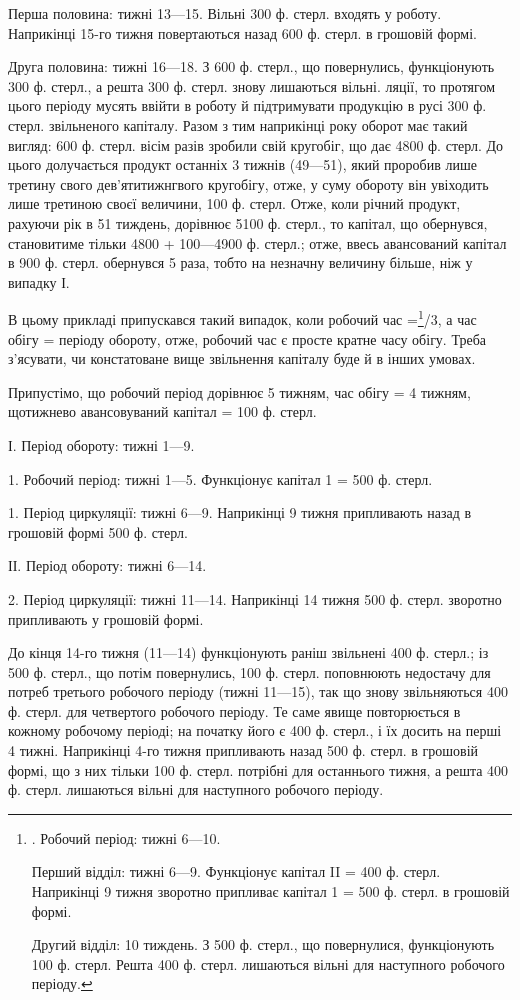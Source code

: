 Перша половина: тижні 13—15. Вільні 300 ф. стерл. входять у
роботу. Наприкінці 15-го тижня повертаються назад 600 ф. стерл. в грошовій
формі.

Друга половина: тижні 16—18. З 600 ф. стерл., що повернулись,
функціонують 300 ф. стерл., а решта 300 ф. стерл. знову лишаються
вільні.
ляції, то протягом цього періоду мусять ввійти в роботу й підтримувати
продукцію в русі 300 ф. стерл. звільненого капіталу. Разом з тим наприкінці
року оборот має такий вигляд: 600 ф. стерл. вісім разів зробили
свій кругобіг, що дає 4800 ф. стерл. До цього долучається продукт
останніх 3 тижнів (49—51), який проробив лише третину свого дев’ятитижнгвого
кругобігу, отже, у суму обороту він увіходить лише третиною
своєї величини, 100 ф. стерл. Отже, коли річний продукт, рахуючи рік в
51 тиждень, дорівнює 5100 ф. стерл., то капітал, що обернувся, становитиме
тільки 4800 + 100—4900 ф. стерл.; отже, ввесь авансований капітал
в 900 ф. стерл. обернувся 5 раза, тобто на незначну величину більше,
ніж у випадку І.

В цьому прикладі припускався такий випадок, коли робочий час =\footnote{
. Робочий період: тижні 6—10.

Перший відділ: тижні 6—9. Функціонує капітал II = 400 ф. стерл.
Наприкінці 9 тижня зворотно припливає капітал 1 = 500 ф. стерл. в грошовій
формі.

Другий відділ: 10 тиждень. З 500 ф. стерл., що повернулися, функціонують
100 ф. стерл. Решта 400 ф. стерл. лишаються вільні для наступного
робочого періоду.
}/3,
а час обігу =  періоду обороту, отже, робочий час є просте кратне
часу обігу. Треба з’ясувати, чи констатоване вище звільнення капіталу
буде й в інших умовах.

Припустімо, що робочий період дорівнює 5 тижням, час обігу = 4 тижням,
щотижнево авансовуваний капітал = 100 ф. стерл.

І. Період обороту: тижні 1—9.

1. Робочий період: тижні 1—5. Функціонує капітал 1 = 500 ф. стерл.

1. Період циркуляції: тижні 6—9. Наприкінці 9 тижня припливають
назад в грошовій формі 500 ф. стерл.

ІІ. Період обороту: тижні 6—14.

2. Період циркуляції: тижні 11—14. Наприкінці 14 тижня 500 ф.
стерл. зворотно припливають у грошовій формі.

До кінця 14-го тижня (11—14) функціонують раніш звільнені 400 ф.
стерл.; із 500 ф. стерл., що потім повернулись, 100 ф. стерл. поповнюють
недостачу для потреб третього робочого періоду (тижні 11—15),
так що знову звільняються 400 ф. стерл. для четвертого робочого періоду.
Те саме явище повторюється в кожному робочому періоді; на
початку його є 400 ф. стерл., і їх досить на перші 4 тижні. Наприкінці
4-го тижня припливають назад 500 ф. стерл. в грошовій формі, що з
них тільки 100 ф. стерл. потрібні для останнього тижня, а решта 400 ф.
стерл. лишаються вільні для наступного робочого періоду.

